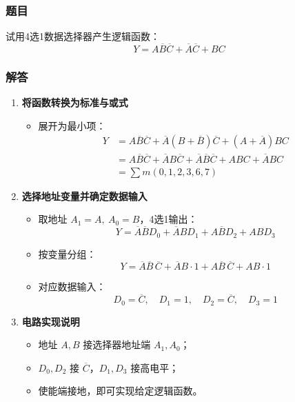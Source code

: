 \subsubsection{题目}
试用4选1数据选择器产生逻辑函数：
\[
Y = A\overline{B}\overline{C} + \overline{A}\overline{C} + BC
\]

\subsubsection{解答}
\begin{enumerate}
    \item \textbf{将函数转换为标准与或式}
    \begin{itemize}
        \item 展开为最小项：
        \[
        \begin{aligned}
        Y &= A\overline{B}\overline{C} + \overline{A}(B+\overline{B})\overline{C} + (A+\overline{A})BC \\
        &= A\overline{B}\overline{C} + \overline{A}B\overline{C} + \overline{A}\overline{B}\overline{C}
        + ABC + \overline{A}BC \\
        &= \sum m(0,1,2,3,6,7)
        \end{aligned}
        \]
    \end{itemize}

    \item \textbf{选择地址变量并确定数据输入}
    \begin{itemize}
        \item 取地址 $A_1=A,\ A_0=B$，4选1输出：
        \[
        Y = \overline{A}\overline{B}D_0 + \overline{A}B D_1 + A\overline{B}D_2 + AB D_3
        \]
        \item 按变量分组：
        \[
        Y = \overline{A}\overline{B}\,\overline{C} + \overline{A}B \cdot 1 + A\overline{B}\,\overline{C} + AB \cdot 1
        \]
        \item 对应数据输入：
        \[
        D_0 = \overline{C},\quad D_1 = 1,\quad D_2 = \overline{C},\quad D_3 = 1
        \]
    \end{itemize}

    \item \textbf{电路实现说明}
    \begin{itemize}
        \item 地址 $A,B$ 接选择器地址端 $A_1,A_0$；
        \item $D_0,D_2$ 接 $\overline{C}$，$D_1,D_3$ 接高电平；
        \item 使能端接地，即可实现给定逻辑函数。
    \end{itemize}
\end{enumerate}

